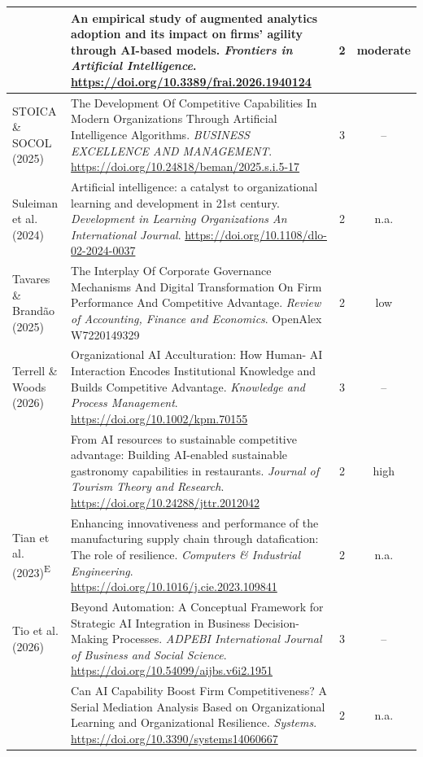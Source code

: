 {\begin{longtable}{|>{\raggedright\arraybackslash}p{2.6cm}|>{\raggedright\arraybackslash}p{10.2cm}|c|c|}
\textcite{srahin2026} & An empirical study of augmented analytics adoption and its impact on firms’ agility through AI-based models. \textit{Frontiers in Artificial Intelligence}. \url{https://doi.org/10.3389/frai.2026.1940124} & 2 & moderate \\ \hline
STOICA \& SOCOL (2025) & The Development Of Competitive Capabilities In Modern Organizations Through Artificial Intelligence Algorithms. \textit{BUSINESS EXCELLENCE AND MANAGEMENT}. \url{https://doi.org/10.24818/beman/2025.s.i.5-17} & 3 & -- \\ \hline
Suleiman et al. (2024) & Artificial intelligence: a catalyst to organizational learning and development in 21st century. \textit{Development in Learning Organizations An International Journal}. \url{https://doi.org/10.1108/dlo-02-2024-0037} & 2 & n.a. \\ \hline
Tavares \& Brandão (2025) & The Interplay Of Corporate Governance Mechanisms And Digital Transformation On Firm Performance And Competitive Advantage. \textit{Review of Accounting, Finance and Economics}. OpenAlex W7220149329 & 2 & low \\ \hline
Terrell \& Woods (2026) & Organizational AI Acculturation: How Human- AI Interaction Encodes Institutional Knowledge and Builds Competitive Advantage. \textit{Knowledge and Process Management}. \url{https://doi.org/10.1002/kpm.70155} & 3 & -- \\ \hline
\textcite{texeira2026} & From AI resources to sustainable competitive advantage: Building AI-enabled sustainable gastronomy capabilities in restaurants. \textit{Journal of Tourism Theory and Research}. \url{https://doi.org/10.24288/jttr.2012042} & 2 & high \\ \hline
Tian et al. (2023)\textsuperscript{E} & Enhancing innovativeness and performance of the manufacturing supply chain through datafication: The role of resilience. \textit{Computers \& Industrial Engineering}. \url{https://doi.org/10.1016/j.cie.2023.109841} & 2 & n.a. \\ \hline
Tio et al. (2026) & Beyond Automation: A Conceptual Framework for Strategic AI Integration in Business Decision-Making Processes. \textit{ADPEBI International Journal of Business and Social Science}. \url{https://doi.org/10.54099/aijbs.v6i2.1951} & 3 & -- \\ \hline
\textcite{tu2026} & Can AI Capability Boost Firm Competitiveness? A Serial Mediation Analysis Based on Organizational Learning and Organizational Resilience. \textit{Systems}. \url{https://doi.org/10.3390/systems14060667} & 2 & n.a. \\ \hline

\end{longtable}}
